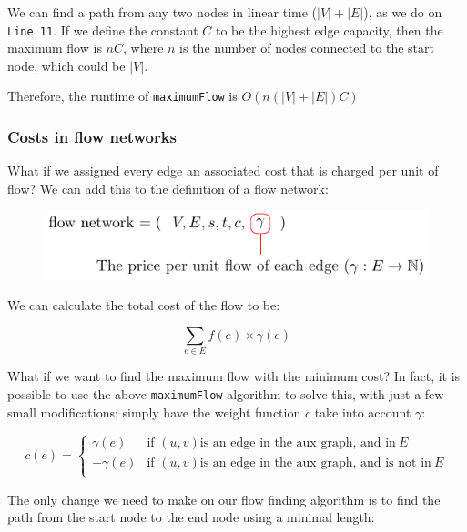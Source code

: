 We can find a path from any two nodes in linear time ($|V| + |E|$), as we do on
\texttt{Line 11}. If we define the constant $C$ to be the highest edge capacity,
then the maximum flow is $nC$, where $n$ is the number of nodes connected to the
start node, which could be $|V|$.

Therefore, the runtime of \texttt{maximumFlow} is $O(n(|V| + |E|)C)$

\subsubsection{Costs in flow networks}

What if we assigned every edge an associated cost that is charged per unit of
flow? We can add this to the definition of a flow network:

\begin{figure}[H]
  \centering
  \includegraphics{equations/flow-network-costs}
  \label{fig:flow-network-definition-costs}
\end{figure}


We can calculate the total cost of the flow to be:

\[
  \sum_{e \in E} f(e) \times \gamma(e)
\]

What if we want to find the maximum flow with the minimum cost? In fact, it is
possible to use the above \texttt{maximumFlow} algorithm to solve this, with
just a few small modifications; simply have the weight function $c$ take into
account $\gamma$:

\[
    c(e) = 
    \begin{cases}
        \gamma(e) & \text{if } (u,v) \text{is an edge in the aux graph, and in}
          ~E\\
        -\gamma(e) & \text{if } (u,v) \text{is an edge in the aux graph, and is
          not in}~E\\
    \end{cases}
\]

The only change we need to make on our flow finding algorithm is to find the
path from the start node to the end node using a minimal length:

